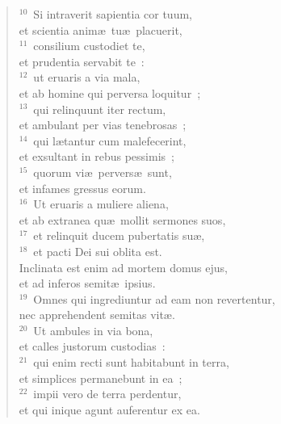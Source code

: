 \begin{flushleft}\begin{verse}${}^{10}$~Si intraverit sapientia cor tuum,\\ et scientia anim\ae\ tu\ae\ placuerit,\\
${}^{11}$~consilium custodiet te,\\ et prudentia servabit te~:\\
${}^{12}$~ut eruaris a via mala,\\ et ab homine qui perversa loquitur~;\\
${}^{13}$~qui relinquunt iter rectum,\\ et ambulant per vias tenebrosas~;\\
${}^{14}$~qui l\ae tantur cum malefecerint,\\ et exsultant in rebus pessimis~;\\
${}^{15}$~quorum vi\ae\ pervers\ae\ sunt,\\ et infames gressus eorum.\\
${}^{16}$~Ut eruaris a muliere aliena,\\ et ab extranea qu\ae\ mollit sermones suos,\\
${}^{17}$~et relinquit ducem pubertatis su\ae ,\\
${}^{18}$~et pacti Dei sui oblita est.\\ Inclinata est enim ad mortem domus ejus,\\ et ad inferos semit\ae\ ipsius.\\
${}^{19}$~Omnes qui ingrediuntur ad eam non revertentur,\\ nec apprehendent semitas vit\ae .\\
${}^{20}$~Ut ambules in via bona,\\ et calles justorum custodias~:\\
${}^{21}$~qui enim recti sunt habitabunt in terra,\\ et simplices permanebunt in ea~;\\
${}^{22}$~impii vero de terra perdentur,\\ et qui inique agunt auferentur ex ea.\end{verse}\end{flushleft}


